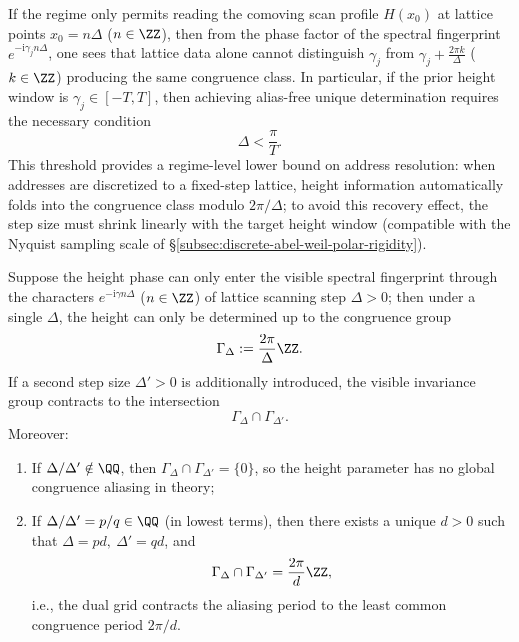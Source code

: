 \begin{proposition}\label{con:xi-grid-scan-aliasing-threshold}
If the regime only permits reading the comoving scan profile \(H(x_0)\) at lattice points \(x_0=n\Delta\) (\(n\in\ZZ\)), then from the phase factor of the spectral fingerprint
\(
e^{-\mathrm{i}\gamma_j n\Delta}
\),
one sees that lattice data alone cannot distinguish \(\gamma_j\) from \(\gamma_j+\frac{2\pi k}{\Delta}\) (\(k\in\ZZ\)) producing the same congruence class.
In particular, if the prior height window is \(\gamma_j\in[-T,T]\), then achieving alias-free unique determination requires the necessary condition
\[
\Delta<\frac{\pi}{T}.
\]
This threshold provides a regime-level lower bound on address resolution: when addresses are discretized to a fixed-step lattice, height information automatically folds into the congruence class modulo \(2\pi/\Delta\); to avoid this recovery effect, the step size must shrink linearly with the target height window (compatible with the Nyquist sampling scale of \S\ref{subsec:discrete-abel-weil-polar-rigidity}).
\end{proposition}

\begin{proposition}\label{con:xi-grid-scan-two-step-dealiasing}
Suppose the height phase can only enter the visible spectral fingerprint through the characters \(e^{-\mathrm{i}\gamma n\Delta}\) (\(n\in\ZZ\)) of lattice scanning step \(\Delta>0\); then under a single \(\Delta\), the height can only be determined up to the congruence group
\[
\Gamma_{\Delta}:=\frac{2\pi}{\Delta}\ZZ.
\]
If a second step size \(\Delta'>0\) is additionally introduced, the visible invariance group contracts to the intersection
\[
\Gamma_{\Delta}\cap \Gamma_{\Delta'}.
\]
Moreover:
\begin{enumerate}
  \item If \(\Delta/\Delta'\notin\QQ\), then \(\Gamma_{\Delta}\cap \Gamma_{\Delta'}=\{0\}\), so the height parameter has no global congruence aliasing in theory;
  \item If \(\Delta/\Delta'=p/q\in\QQ\) (in lowest terms), then there exists a unique \(d>0\) such that \(\Delta=pd,\ \Delta'=qd\), and
  \[
  \Gamma_{\Delta}\cap \Gamma_{\Delta'}=\frac{2\pi}{d}\ZZ,
  \]
  i.e., the dual grid contracts the aliasing period to the least common congruence period \(2\pi/d\).
\end{enumerate}
\end{proposition}

